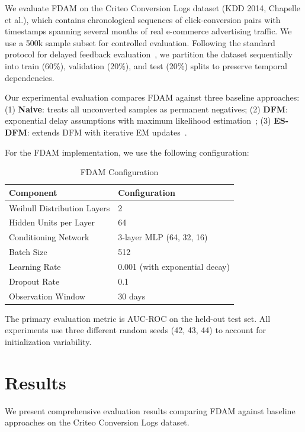 \documentclass{article}
\begin{document}
We evaluate FDAM on the Criteo Conversion Logs dataset (KDD 2014, Chapelle et al.), which contains chronological sequences of click-conversion pairs with timestamps spanning several months of real e-commerce advertising traffic. We use a 500k sample subset for controlled evaluation. Following the standard protocol for delayed feedback evaluation~\cite{yang2020capturing}, we partition the dataset sequentially into train (60\%), validation (20\%), and test (20\%) splits to preserve temporal dependencies.

Our experimental evaluation compares FDAM against three baseline approaches: (1) \textbf{Naive}: treats all unconverted samples as permanent negatives; (2) \textbf{DFM}: exponential delay assumptions with maximum likelihood estimation~\cite{yang2020capturing}; (3) \textbf{ES-DFM}: extends DFM with iterative EM updates~\cite{gu2021real}.

For the FDAM implementation, we use the following configuration:

\begin{table}[h]
\centering
\caption{FDAM Configuration}
\begin{tabular}{@{}ll@{}}
\toprule
Component & Configuration \\
\midrule
Weibull Distribution Layers & 2 \\
Hidden Units per Layer & 64 \\
Conditioning Network & 3-layer MLP (64, 32, 16) \\
Batch Size & 512 \\
Learning Rate & 0.001 (with exponential decay) \\
Dropout Rate & 0.1 \\
Observation Window & 30 days \\
\bottomrule
\end{tabular}
\end{table}

The primary evaluation metric is AUC-ROC on the held-out test set. All experiments use three different random seeds (42, 43, 44) to account for initialization variability.

\section{Results}

We present comprehensive evaluation results comparing FDAM against baseline approaches on the Criteo Conversion Logs dataset.
\end{document}
